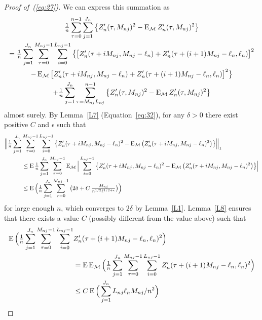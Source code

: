 \documentclass[11pt]{article}
\begin{document}
\begin{proof}[Proof of~(\ref{eq:27})]
  We can express this summation as
  \begin{multline}\label{eq:29}
    \tfrac{1}{n} \sum_{\tau=0}^{n-1}  \sum_{j=1}^{J_n}
    \big\{Z_n'(\tau, M_{nj})^2 - \operatorname{E}_{\mathcal{M}} Z_n'(\tau, M_{nj})^2 \big\}
    \\ =
    \tfrac{1}{n} \sum_{j=1}^{J_n} \sum_{\tau=0}^{M_{nj}-1}
    \sum_{i=0}^{L_{nj}-1}\big\{\big[ Z_n'(\tau + i M_{nj}, M_{nj} - \ell_n) + Z_n'(\tau + (i+1) M_{nj} - \ell_n, \ell_n)\big]^2 \\
    - \operatorname{E}_{\mathcal{M}}\big[ Z_n'(\tau + i M_{nj}, M_{nj} - \ell_n) + Z_n'(\tau + (i+1) M_{nj} - \ell_n, \ell_n)\big]^2 \big\} \\
    + \tfrac{1}{n} \sum_{j=1}^{J_n} \sum_{\tau= M_{nj}L_{nj}}^{n-1}
    \big\{Z_{n}'(\tau, M_{nj})^2 - \operatorname{E}_{\mathcal{M}} Z_n'(\tau, M_{nj})^2 \big\}
  \end{multline}
  almost surely.
  By Lemma~\ref{L7} (Equation~\ref{eq:32}), for
  any $\delta > 0$ there exist positive $C$ and $\epsilon$ such that
  \begin{align*}
    \Big\lVert\tfrac{1}{n} \sum_{j=1}^{J_n} & \sum_{\tau=0}^{M_{nj}-1}
    \sum_{i=0}^{L_{nj}-1} \big\{ Z_n'(\tau + i M_{nj}, M_{nj} - \ell_n)^2 -
    \operatorname{E}_{\mathcal{M}} \big(Z_n'(\tau + i M_{nj}, M_{nj} - \ell_n)^2\big) \big\}\Big\rVert_1 \\
    &\leq \operatorname{E} \tfrac{1}{n} \sum_{j=1}^{J_n} \sum_{\tau=0}^{M_{nj}-1}
    \operatorname{E}_{\mathcal{M}} \Big| \sum_{i=0}^{L_{nj}-1} \big\{ Z_n'(\tau + i M_{nj}, M_{nj} - \ell_n)^2 -
    \operatorname{E}_{\mathcal{M}} \big(Z_n'(\tau + i M_{nj}, M_{nj} - \ell_n)^2\big) \big\} \Big|\\
    &\leq \operatorname{E} \Big(\tfrac{1}{n} \sum_{j=1}^{J_n} \sum_{\tau=0}^{M_{nj}-1}
    \big(2 \delta + C \, \tfrac{M_{nj}}{n^{1/2} \ell^{1/2+\epsilon}}\big)\Big)
  \end{align*}
  for large enough $n$, which converges to $2 \delta$ by
  Lemma~\ref{L1}.
  Lemma~\ref{L8} ensures that there
  exists a value $C$ (possibly different from the value above) such
  that
  \begin{align*}
    \operatorname{E}\Big(\tfrac{1}{n}  \sum_{j=1}^{J_n} \sum_{\tau=0}^{M_{nj}-1} \sum_{i=0}^{L_{nj}-1}
    & Z_n'(\tau + (i+1) M_{nj} - \ell_n, \ell_n)^2 \Big) \\
    &= \operatorname{E} \operatorname{E}_{\mathcal{M}} \Big(\tfrac{1}{n}  \sum_{j=1}^{J_n} \sum_{\tau=0}^{M_{nj}-1} \sum_{i=0}^{L_{nj}-1}
    Z_n'(\tau + (i+1) M_{nj} - \ell_n, \ell_n)^2 \Big) \\
    &\leq C \operatorname{E} \Big(\sum_{j=1}^{J_n} L_{nj} \ell_n M_{nj} / n^2\Big)
  \end{align*}

\end{proof}
\end{document}

